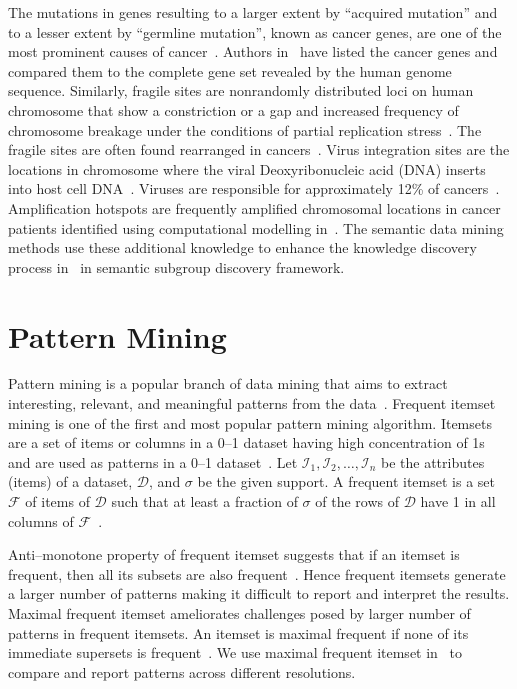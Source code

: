 The mutations in genes resulting to a larger extent by ``acquired 
mutation'' and to a lesser extent by ``germline mutation'', known 
as cancer genes, are one of the most prominent causes of 
cancer~\cite{futreal2004}. Authors in~\cite{futreal2004} have 
listed the cancer genes and compared them to the complete gene
set revealed by the human genome sequence. Similarly, fragile 
sites are nonrandomly distributed loci on human  chromosome 
that show a constriction or a gap and increased frequency of 
chromosome breakage under the conditions of partial 
replication stress~\cite{durkin07,schwartz06}. The fragile 
sites are often found rearranged in cancers~\cite{glover2005}. 
Virus integration sites are the locations in chromosome where 
the viral Deoxyribonucleic acid (DNA) inserts into host cell 
DNA~\cite{khoury2013}. Viruses are responsible for approximately 
12\% of cancers~\cite{khoury2013,zurHausen2009}. Amplification 
hotspots are frequently amplified chromosomal locations in cancer 
patients identified using computational modelling in~\cite{myllykangas06}.
The semantic data mining methods use these additional knowledge  
to enhance the knowledge discovery process in~ in 
semantic subgroup discovery framework.

\section{Pattern Mining}
\label{s:patternmining}

Pattern mining is a popular branch of data mining that aims to 
extract interesting, relevant, and meaningful patterns from the 
data~\cite{han2007,hand01}. Frequent itemset mining 
is one of the first and most popular pattern mining algorithm. 
Itemsets are a set of items or columns in a 0--1 
dataset having high concentration of 1s and are used as 
patterns in a 0--1 dataset~\cite{tatti08}. 
Let $\mathcal{I}_1,\mathcal{I}_2,\ldots,\mathcal{I}_n $ be the 
attributes (items) of a dataset, $\mathcal{D}$, and $\sigma$ be 
the given support. A frequent itemset is 
a set $\mathcal{F}$ of items of $\mathcal{D}$ such 
that at least a fraction of $\sigma$ of the rows of $\mathcal{D}$ 
have 1 in all columns of $\mathcal{F}$~\cite{agrawal1993,mannila1994}.

Anti--monotone property of frequent itemset suggests that if an 
itemset is frequent, then all its subsets %
are also frequent~\cite{gallo2008}. Hence frequent itemsets 
generate a larger number of patterns making it difficult to 
report and interpret the results. Maximal frequent itemset 
ameliorates challenges posed by larger number of patterns
in frequent itemsets. An itemset is maximal frequent if none 
of its immediate supersets is  frequent~\cite{burdick01}. 
We use maximal frequent itemset  in~ to compare 
and report patterns across different resolutions.

